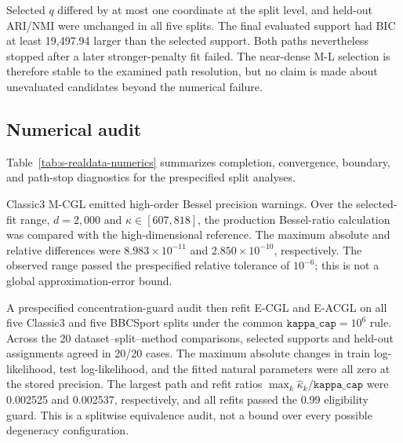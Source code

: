 \documentclass[preprint,12pt,authoryear]{elsarticle}
\begin{document}
Selected $q$ differed by at most one coordinate at the split level, and
held-out ARI/NMI were unchanged in all five splits. The final evaluated
support had BIC at least 19,497.94 larger than the selected support. Both
paths nevertheless stopped after a later stronger-penalty fit failed. The
near-dense M-L selection is therefore stable to the examined path resolution,
but no claim is made about unevaluated candidates beyond the numerical
failure.

\subsection{Numerical audit}

Table~\ref{tab:s-realdata-numerics} summarizes completion, convergence,
boundary, and path-stop diagnostics for the prespecified split analyses.

\begin{table}[H]
\centering
\small
\caption{Convergence and boundary diagnostics for the methods included in the
final prespecified split-performance tables.}
\label{tab:s-realdata-numerics}
\end{table}

Classic3 M-CGL emitted high-order Bessel precision warnings. Over the
selected-fit range, $d=2{,}000$ and $\kappa\in[607,818]$, the production
Bessel-ratio calculation was compared with the high-dimensional reference.
The maximum absolute and relative differences were
$8.983\times10^{-11}$ and $2.850\times10^{-10}$, respectively. The observed
range passed the prespecified relative tolerance of $10^{-6}$; this is not a
global approximation-error bound.

A prespecified concentration-guard audit then refit E-CGL and E-ACGL on all five
Classic3 and five BBCSport splits under the common
$\texttt{kappa\_cap}=10^6$ rule. Across the 20 dataset--split--method
comparisons, selected supports and held-out assignments agreed in 20/20
cases. The maximum absolute changes in train log-likelihood, test
log-likelihood, and the fitted natural parameters were all zero at the stored
precision. The largest path and refit ratios
$\max_k\widehat\kappa_k/\texttt{kappa\_cap}$ were 0.002525 and 0.002537,
respectively, and all refits passed the 0.99 eligibility guard. This is a
splitwise equivalence audit, not a bound over every possible degeneracy
configuration.
\end{document}

